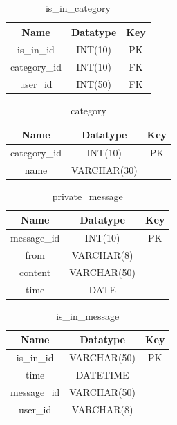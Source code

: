 \begin{table}[!ht]
\caption{is\_in\_category}
\centering
\begin{tabular}{c c c}
\hline\hline
Name               & Datatype    & Key \\
\hline
is\_in\_id         & INT(10)     & PK   \\
category\_id       & INT(10)     & FK   \\
user\_id           & INT(50)     & FK   \\
\hline
\end{tabular}
\label{table:nonlin}
\end{table}

\begin{table}[!ht]
\caption{category}
\centering
\begin{tabular}{c c c}
\hline\hline
Name               & Datatype    & Key \\
\hline
category\_id       & INT(10)     & PK  \\
name               & VARCHAR(30) &     \\
\hline
\end{tabular}
\label{table:nonlin}
\end{table}


\begin{table}[!ht]
\caption{private\_message}
\centering
\begin{tabular}{c c c}
\hline\hline
Name               & Datatype    & Key \\
\hline
message\_id        & INT(10)     & PK  \\
from               & VARCHAR(8)  &     \\
content            & VARCHAR(50) &     \\
time               & DATE        &     \\
\hline
\end{tabular}
\label{table:nonlin}
\end{table}

\begin{table}[!ht]
\caption{is\_in\_message}
\centering
\begin{tabular}{c c c}
\hline\hline
Name               & Datatype        & Key \\
\hline
is\_in\_id         & VARCHAR(50)     & PK  \\
time               & DATETIME        &     \\
message\_id        & VARCHAR(50)     &     \\
user\_id           & VARCHAR(8)      &     \\
\hline
\end{tabular}
\label{table:nonlin}
\end{table}

